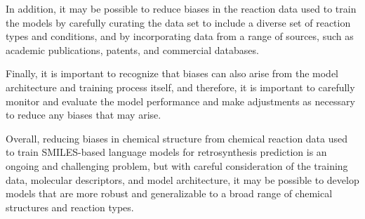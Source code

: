 In addition, it may be possible to reduce biases in the reaction data used to train the models by carefully curating the data set to include a diverse set of reaction types and conditions, and by incorporating data from a range of sources, such as academic publications, patents, and commercial databases.

Finally, it is important to recognize that biases can also arise from the model architecture and training process itself, and therefore, it is important to carefully monitor and evaluate the model performance and make adjustments as necessary to reduce any biases that may arise.

Overall, reducing biases in chemical structure from chemical reaction data used to train SMILES-based language models for retrosynthesis prediction is an ongoing and challenging problem, but with careful consideration of the training data, molecular descriptors, and model architecture, it may be possible to develop models that are more robust and generalizable to a broad range of chemical structures and reaction types.




